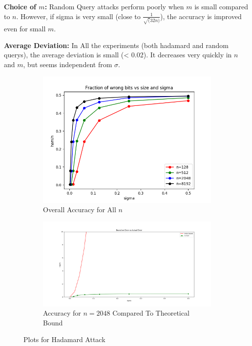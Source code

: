 \noindent \textbf{Choice of $m$:} Random Query attacks perform poorly when $m$ is small compared to $n$. However, if sigma is very small (close to $\frac{1}{\sqrt(32n)}$), the accuracy is improved even for small $m$.

\noindent \textbf{Average Deviation:} In All the experiments (both hadamard and random querys), the average deviation is small (< 0.02). It decreases very quickly in $n$ and $m$, but seems independent from $\sigma$.

\begin{figure}
    \centering
    \begin{subfigure}[b]{0.5\textwidth}
        \includegraphics[width=\textwidth]{hadmard/Hadamard-all.png}
        \caption{Overall Accuracy for All $n$}
        \label{fig:hadamard-all}
    \end{subfigure}
    \begin{subfigure}[b]{\textwidth}
        \includegraphics[width=\textwidth]{hadmard/Hadamard-N512.png}
        \caption{Accuracy for $n=2048$ Compared To Theoretical Bound}
        \label{fig:hadamard-theory}
    \end{subfigure}
    \caption{Plots for Hadamard Attack}\label{fig:hadamards}
\end{figure}

